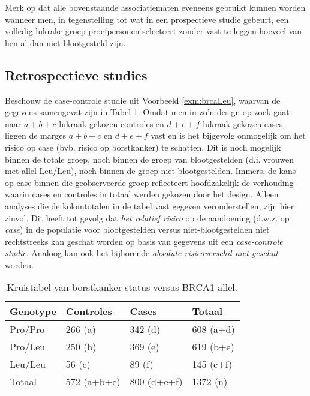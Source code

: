 \documentclass[12pt,dutch,coursenotes]{book}
\theoremstyle{definition}
\theoremstyle{definition}
\theoremstyle{definition}
\theoremstyle{remark}
\begin{document}
Merk op dat alle bovenstaande associatiematen eveneens gebruikt kunnen
worden wanneer men, in tegenstelling tot wat in een prospectieve studie
gebeurt, een volledig lukrake groep proefpersonen selecteert zonder vast
te leggen hoeveel van hen al dan niet blootgesteld zijn.

\subsection{Retrospectieve studies}\label{subsec:retrospect}

Beschouw de case-controle studie uit Voorbeeld \ref{exm:brcaLeu},
waarvan de gegevens samengevat zijn in Tabel \ref{tab:leu2}. Omdat men
in zo'n design op zoek gaat naar \(a+b+c\) lukraak gekozen controles en
\(d+e+f\) lukraak gekozen cases, liggen de marges \(a+b+c\) en \(d+e+f\)
vast en is het bijgevolg onmogelijk om het risico op case (bvb. risico
op borstkanker) te schatten. Dit is noch mogelijk binnen de totale
groep, noch binnen de groep van blootgestelden (d.i. vrouwen met allel
Leu/Leu), noch binnen de groep niet-blootgestelden. Immers, de kans op
case binnen die geobserveerde groep reflecteert hoofdzakelijk de
verhouding waarin cases en controles in totaal werden gekozen door het
design. Alleen analyses die de kolomtotalen in de tabel vast gegeven
veronderstellen, zijn hier zinvol. Dit heeft tot gevolg dat \emph{het
relatief risico} op de aandoening (d.w.z. op \emph{case}) in de
populatie voor blootgestelden versus niet-blootgestelden niet
rechtstreeks kan geschat worden op basis van gegevens uit een
\emph{case-controle studie}. Analoog kan ook het bijhorende
\emph{absolute risicoverschil niet geschat} worden.

\begin{table}[t]

\caption{\label{tab:leu2}Kruistabel van borstkanker-status versus BRCA1-allel.}
\centering
\begin{tabular}{llll}
\toprule
Genotype & Controles & Cases & Totaal\\
\midrule
Pro/Pro & 266 (a) & 342 (d) & 608 (a+d)\\
Pro/Leu & 250 (b) & 369 (e) & 619 (b+e)\\
Leu/Leu & 56 (c) & 89 (f) & 145 (c+f)\\
Totaal & 572 (a+b+c) & 800 (d+e+f) & 1372 (n)\\
\bottomrule
\end{tabular}
\end{table}
\end{document}
